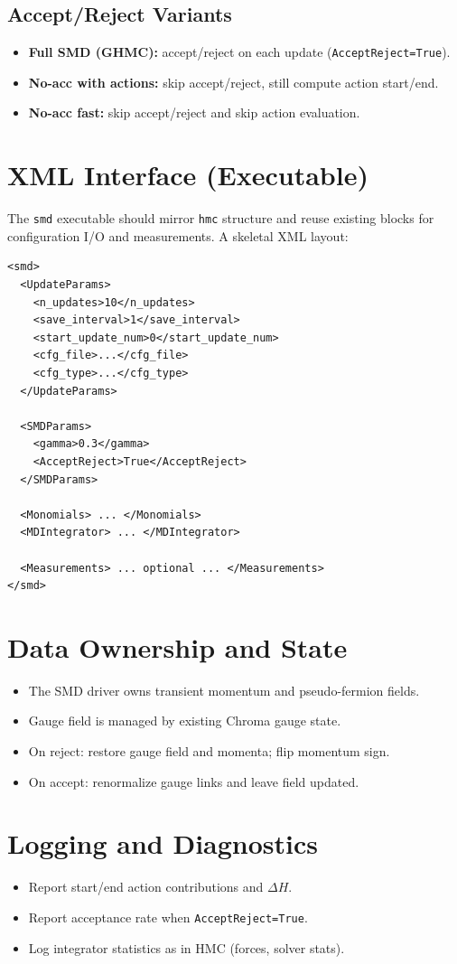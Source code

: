 \documentclass[11pt]{article}
\begin{document}
\subsection{Accept/Reject Variants}
\begin{itemize}[leftmargin=*]
  \item \textbf{Full SMD (GHMC):} accept/reject on each update (\texttt{AcceptReject=True}).
  \item \textbf{No-acc with actions:} skip accept/reject, still compute action start/end.
  \item \textbf{No-acc fast:} skip accept/reject and skip action evaluation.
\end{itemize}

\section{XML Interface (Executable)}
The \texttt{smd} executable should mirror \texttt{hmc} structure and reuse existing
blocks for configuration I/O and measurements. A skeletal XML layout:
\begin{lstlisting}[basicstyle=\ttfamily\small]
<smd>
  <UpdateParams>
    <n_updates>10</n_updates>
    <save_interval>1</save_interval>
    <start_update_num>0</start_update_num>
    <cfg_file>...</cfg_file>
    <cfg_type>...</cfg_type>
  </UpdateParams>

  <SMDParams>
    <gamma>0.3</gamma>
    <AcceptReject>True</AcceptReject>
  </SMDParams>

  <Monomials> ... </Monomials>
  <MDIntegrator> ... </MDIntegrator>

  <Measurements> ... optional ... </Measurements>
</smd>
\end{lstlisting}


\section{Data Ownership and State}
\begin{itemize}[leftmargin=*]
  \item The SMD driver owns transient momentum and pseudo-fermion fields.
  \item Gauge field is managed by existing Chroma gauge state.
  \item On reject: restore gauge field and momenta; flip momentum sign.
  \item On accept: renormalize gauge links and leave field updated.
\end{itemize}

\section{Logging and Diagnostics}
\begin{itemize}[leftmargin=*]
  \item Report start/end action contributions and \(\Delta H\).
  \item Report acceptance rate when \texttt{AcceptReject=True}.
  \item Log integrator statistics as in HMC (forces, solver stats).
\end{itemize}
\end{document}
